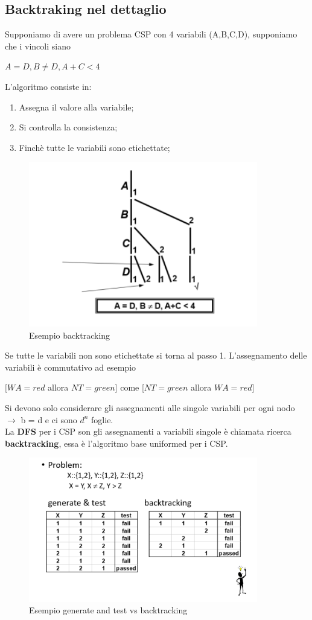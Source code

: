 \subsection{Backtraking nel dettaglio}
Supponiamo di avere un problema CSP con 4 variabili (A,B,C,D), supponiamo che i vincoli siano
\begin{center}
    $A = D, B \neq D, A + C < 4$
\end{center}
L’algoritmo consiste in:
\begin{enumerate}
    \item Assegna il valore alla variabile;
    \item Si controlla la consistenza;
    \item Finchè tutte le variabili sono etichettate;
\end{enumerate}
\begin{figure}[htp]
	\centering
    \includegraphics[width=10cm, keepaspectratio]{img/Cap2/back1.png}
    \caption{Esempio backtracking}
\end{figure}
Se tutte le variabili non sono etichettate si torna al passo 1. L’assegnamento delle variabili è commutativo ad esempio
\begin{center}
    $[WA = red$ allora $NT = green]$ come [$NT=green$ allora $WA =red]$
\end{center}


Si devono solo considerare gli assegnamenti alle singole variabili per ogni nodo $\rightarrow$ b = d
e ci sono $d^n$ foglie. 
\\La \textbf{DFS} per i CSP son gli assegnamenti a variabili singole è chiamata ricerca \textbf{backtracking}, essa è l’algoritmo base uniformed per i CSP.
\begin{figure}[htp]
	\centering
    \includegraphics[width=10cm, keepaspectratio]{img/Cap2/back2.png}
    \caption{Esempio generate and test vs backtracking}
\end{figure}


